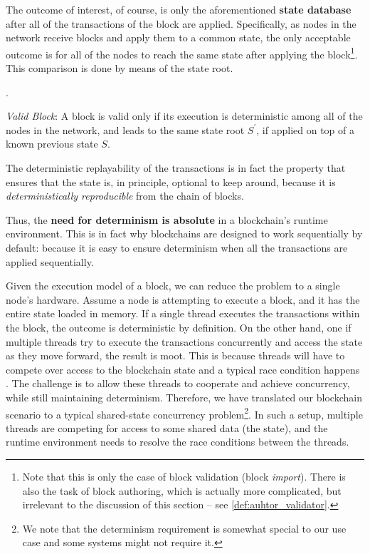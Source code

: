 The outcome of interest, of course, is only the aforementioned \textbf{state database} after all of
the transactions of the block are applied. Specifically, as nodes in the network receive blocks and
apply them to a common state, the only acceptable outcome is for all of the nodes to reach the same
state after applying the block\footnote{Note that this is only the case of block validation (block
\textit{import}). There is also the task of block authoring, which is actually more complicated, but
irrelevant to the discussion of this section -- see \ref{def:auhtor_validator}.}. This comparison is
done by means of the state root.

.

\begin{definition} \label{def:valid_block} \textit{Valid Block}: A block is valid only if its
	execution is deterministic among all of the nodes in the network, and leads to the same state
	root $S^{'}$, if applied on top of a known previous state $S$.
\end{definition}

\begin{remark}
	The deterministic replayability of the transactions is in fact the property that ensures that
	the state is, in principle, optional to keep around, because it is \textit{deterministically
	reproducible} from the chain of blocks.
\end{remark}

Thus, the \textbf{need for determinism is absolute} in a blockchain's runtime environment. This is
in fact why blockchains are designed to work sequentially by default: because it is easy to ensure
determinism when all the transactions are applied sequentially.

Given the execution model of a block, we can reduce the problem to a single node's hardware. Assume
a node is attempting to execute a block, and it has the entire state loaded in memory. If a single
thread executes the transactions within the block, the outcome is deterministic by definition. On
the other hand, one if multiple threads try to execute the transactions concurrently and access the
state as they move forward, the result is moot. This is because threads will have to compete over
access to the blockchain state and a typical race condition happens \cite{14:00-17:00ISOIEC9899}.
The challenge is to allow these threads to cooperate and achieve concurrency, while still
maintaining determinism. Therefore, we have translated our blockchain scenario to a typical
shared-state concurrency problem\footnote{We note that the determinism requirement is somewhat
special to our use case and some systems might not require it.}. In such a setup, multiple threads
are competing for access to some shared data (the state), and the runtime environment needs to
resolve the race conditions between the threads.


